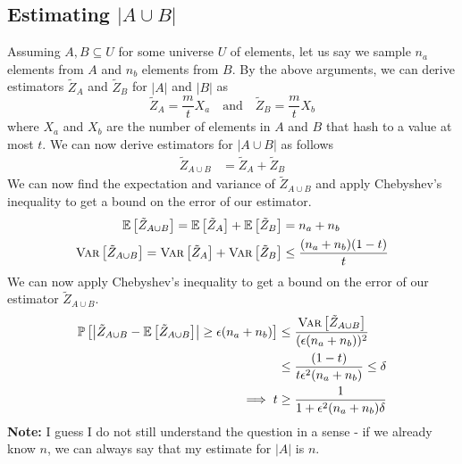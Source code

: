 \documentclass[9pt]{article}
\newcommand{\Probability}[1]{\mathbb{P}\left[ #1 \right]}
\newcommand{\Expectation}[1]{\mathbb{E}\left[ #1 \right]}
\newcommand{\Variance}[1]{\textsc{Var}\left[ #1 \right]}
\begin{document}
\subsection*{\textbf{Estimating $|A \cup B|$}}
Assuming $A, B \subseteq U$ for some universe $U$ of elements, let us say we sample $n_{a}$ elements
from $A$ and $n_{b}$ elements from $B$. By the above arguments, we can derive estimators $\tilde{Z}_{A}$
and $\tilde{Z}_{B}$ for $|A|$ and $|B|$ as
\begin{equation}
    \tilde{Z}_{A} = \frac{m}{t} X_{a} \quad \text{and} \quad \tilde{Z}_{B} = \frac{m}{t} X_{b}
\end{equation}
where $X_{a}$ and $X_{b}$ are the number of elements in $A$ and $B$ that hash to a value
at most $t$. We can now derive estimators for $|A \cup B|$ as follows
\begin{align}
    \tilde{Z}_{A \cup B} &= \tilde{Z}_{A} + \tilde{Z}_{B}
\end{align}
We can now find the expectation and variance of $\tilde{Z}_{A \cup B}$ and apply Chebyshev's
inequality to get a bound on the error of our estimator.
\begin{align}
    \Expectation{\tilde{Z}_{A \cup B}} = \Expectation{\tilde{Z}_{A}} + \Expectation{\tilde{Z}_{B}} &= n_{a} + n_{b} \\
    \Variance{\tilde{Z}_{A \cup B}} = \Variance{\tilde{Z}_{A}} + \Variance{\tilde{Z}_{B}}
    &\leq \frac{(n_{a} + n_{b})(1-t)}{t}
\end{align}
We can now apply Chebyshev's inequality to get a bound on the error of our estimator $\tilde{Z}_{A \cup B}$.
\begin{align}
    \begin{split}
        \Probability{\left| \tilde{Z}_{A \cup B} - \Expectation{\tilde{Z}_{A \cup B}} \right| \geq \epsilon (n_{a} + n_{b})}
        &\leq \frac{\Variance{\tilde{Z}_{A \cup B}}}{(\epsilon (n_{a} + n_{b}))^{2}} \\
        &\leq \frac{(1-t)}{t \epsilon^{2} (n_{a} + n_{b})} \leq \delta \\
        \implies t &\geq \frac{1}{1 + \epsilon^{2} (n_{a} + n_{b}) \delta}
    \end{split}
\end{align}
\textbf{Note:} I guess I do not still understand the question in a sense - if we already know $n$, we can
always say that my estimate for $|A|$ is $n$.
\end{document}
